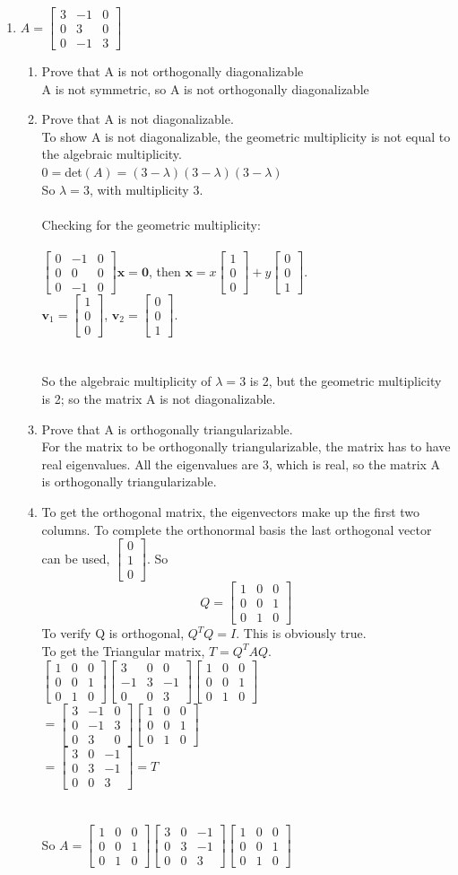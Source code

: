 \documentclass{article}
\newcommand\tab[1][1cm]{\hspace*{#1}}
\newcommand{\newVect}[3]{\begin{bmatrix}#1 \\ #2 \\ #3\end{bmatrix}}
\newcommand{\newttt}[9]{\begin{bmatrix}#1 & #2 & #3\\ #4 & #5 & #6 \\ #7 & #8 & #9\end{bmatrix}}
\begin{document}
\begin{enumerate}
\item 
$A = \newttt{3}{-1}{0}{0}{3}{0}{0}{-1}{3}$
\begin{enumerate}
    \item Prove that A is not orthogonally diagonalizable\\
    A is not symmetric, so A is not orthogonally diagonalizable
    \item Prove that A is not diagonalizable.\\
    To show A is not diagonalizable, the geometric multiplicity is not equal to the algebraic multiplicity.\\
    $0 = $det$(A) = (3-\lambda)(3-\lambda)(3-\lambda)$\\
    So $\lambda = 3$, with multiplicity 3.\\\\
    \tab Checking for the geometric multiplicity:\\\\
    $\newttt{0}{-1}{0}{0}{0}{0}{0}{-1}{0}\textbf{x} = \textbf{0}$, then $\textbf{x} = x\newVect{1}{0}{0} + y\newVect{0}{0}{1}$.\\
    $\textbf{v}_1 = \newVect{1}{0}{0}$, $\textbf{v}_2 = \newVect{0}{0}{1}$.\\\\\\
    So the algebraic multiplicity of $\lambda = 3$ is 2, but the geometric multiplicity is 2; so the matrix A is not diagonalizable.\\
    \item Prove that A is orthogonally triangularizable.\\
    For the matrix to be orthogonally triangularizable, the matrix has to have real eigenvalues. All the eigenvalues are 3, which is real, so the matrix A is orthogonally triangularizable.\\
    \item To get the orthogonal matrix, the eigenvectors make up the first two columns. To complete the orthonormal basis the last orthogonal vector can be used, $\newVect{0}{1}{0}$. So 
    $$Q =\newttt{1}{0}{0}{0}{0}{1}{0}{1}{0}$$
    To verify Q is orthogonal, $Q^TQ= I$. This is obviously true.\\
    To get the Triangular matrix, $T = Q^TAQ$.
    \newpage
    $\newttt{1}{0}{0}{0}{0}{1}{0}{1}{0}\newttt{3}{0}{0}{-1}{3}{-1}{0}{0}{3}
     \newttt{1}{0}{0}{0}{0}{1}{0}{1}{0}$\\
    $= \newttt{3}{-1}{0}{0}{-1}{3}{0}{3}{0}\newttt{1}{0}{0}{0}{0}{1}{0}{1}{0}$\\
    $= \newttt{3}{0}{-1}{0}{3}{-1}{0}{0}{3} = T$\\\\\\
    So $A = \newttt{1}{0}{0}{0}{0}{1}{0}{1}{0}\newttt{3}{0}{-1}{0}{3}{-1}{0}{0}{3}
            \newttt{1}{0}{0}{0}{0}{1}{0}{1}{0}$\\
\end{enumerate}



\end{enumerate}
\end{document}
